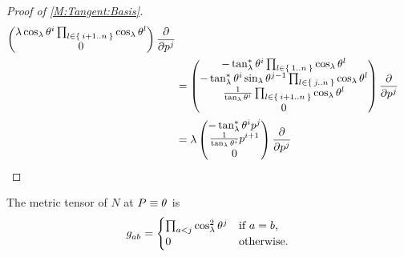 \documentclass[../methodology.tex]{subfiles}
\begin{document}
\begin{proof}[Proof of \cref{M:Tangent:Basis}]
\begin{align*}
\begin{pmatrix}
      \lambda\cos_\lambda{\tensor{\theta}{^{i}}}\prod_{l\in\Set{i+1..n}}{\cos_\lambda{\tensor{\theta}{^l}}}                                                \\
      0                                                                                                                                                    \\
    \end{pmatrix}\frac{\partial}{\partial\tensor{p}{^j}} \\
     & =
    \begin{pmatrix}
      -\tan_\lambda^\ast{\tensor{\theta}{^i}}\prod_{l\in\Set{1..n}}{\cos_\lambda{\tensor{\theta}{^l}}}                                      \\
      -\tan_\lambda^\ast{\tensor{\theta}{^i}}\sin_\lambda{\tensor{\theta}{^{j-1}}}\prod_{l\in\Set{j..n}}{\cos_\lambda{\tensor{\theta}{^l}}} \\
      \frac{1}{\tan_\lambda{\tensor{\theta}{^{i}}}}\prod_{l\in\Set{i+1..n}}{\cos_\lambda{\tensor{\theta}{^l}}}                              \\
      0                                                                                                                                     \\
    \end{pmatrix}
    \frac{\partial}{\partial\tensor{p}{^j}}                                                                                                                                      \\
     & =
    \lambda
    \begin{pmatrix}
      -\tan_\lambda^\ast\tensor{\theta}{^i}\tensor{p}{^j}         \\
      \frac{1}{\tan_\lambda\tensor{\theta}{^i}}\tensor{p}{^{i+1}} \\
      0
    \end{pmatrix}\frac{\partial}{\partial\tensor{p}{^j}}
     & \qedhere
  \end{align*}
\end{proof}
\begin{lemma}\label{M:MetricTensor}
  The metric tensor of \(N\) at \(P\equiv\tensor{\theta}{}\) is
  \[
    \tensor{g}{_a_b}=
    \begin{cases}
      \prod_{a<j}{\cos_\lambda^2\tensor{\theta}{^j}} & \text{if \(a=b\),} \\
      0                                              & \text{otherwise.}  \\
    \end{cases}
  \]
\end{lemma}
\end{document}
